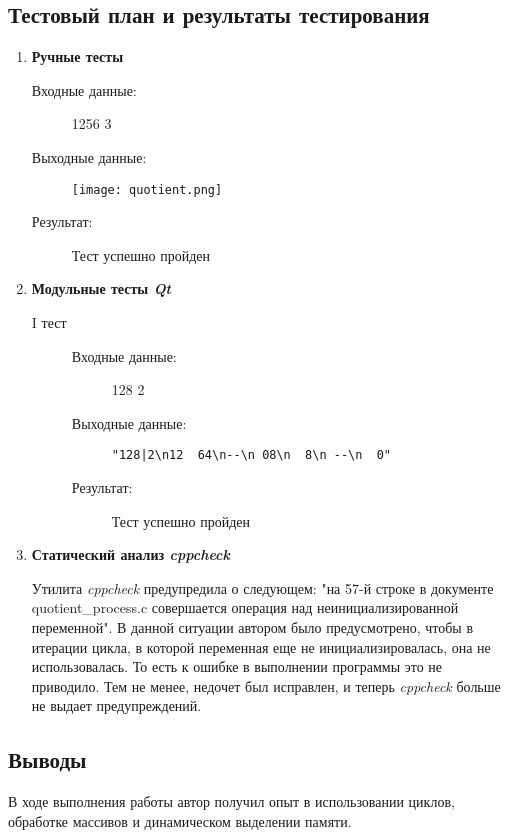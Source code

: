\documentclass[12pt,a4paper]{report}
\begin{document}
\subsection{Тестовый план и результаты тестирования}
\hspace{\parindent}
\begin{enumerate}

\item \textbf{Ручные тесты}

\begin{description}
\item[Входные данные:] 1256 3
\item[Выходные данные:] \texttt{[image: quotient.png]}
\item[Результат:] Тест успешно пройден

\end{description}

\item \textbf{Модульные тесты \textit{Qt}}

\begin{description}
\item[I тест]
\hspace{\parindent}
\begin{flushleft}
\begin{description}
\item[Входные данные:] 128 2
\item[Выходные данные:] \verb/"128|2\n12  64\n--\n 08\n  8\n --\n  0"/
\item[Результат:] Тест успешно пройден
\end{description}
\end{flushleft}
\end{description}

\item \textbf{Статический анализ \textit{cppcheck}}

Утилита \textit{cppcheck} предупредила о следующем: "на 57-й строке в документе quotient\_process.c совершается операция над неинициализированной переменной".
В данной ситуации автором было предусмотрено, чтобы в итерации цикла, в которой переменная еще не инициализировалась, она не использовалась. То есть к ошибке в выполнении программы это не приводило. Тем не менее, недочет был исправлен, и теперь \textit{cppcheck} больше не выдает предупреждений.
\end{enumerate}
\subsection{Выводы}
\hspace{\parindent}
В ходе выполнения работы автор получил опыт в использовании циклов, обработке массивов и динамическом выделении памяти.
\end{document}
